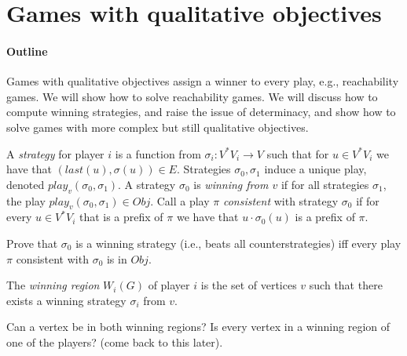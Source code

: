 \documentclass[a4paper,10pt]{article}
\newcommand{\obj}{Obj}
\begin{document}


\section{Games with qualitative objectives} 
\paragraph{Outline} Games with qualitative objectives assign a winner to every play, e.g., reachability games. We will show how to solve reachability games. We will discuss how to compute winning strategies, and raise the issue of determinacy, and show how to solve games with more complex but still qualitative objectives.

\begin{definition}
A \emph{strategy} for player $i$ is a function from $\sigma_i:V^*V_i \to V$ such 
that for $u \in V^*V_i$ we have that $(last(u),\sigma(u)) \in E$. 
Strategies $\sigma_0, \sigma_1$ induce a unique play, denoted $play_v(\sigma_0,\sigma_1)$.
A strategy $\sigma_0$ is \emph{winning from $v$} if for all strategies $\sigma_1$, the play $play_v(\sigma_0,\sigma_1) \in \obj$.
Call a play $\pi$ \emph{consistent} with strategy $\sigma_0$ if for every $u \in V^*V_i$ that is a prefix of $\pi$ we have that 
 $u \cdot \sigma_0(u)$ is a prefix of $\pi$. 
\end{definition}


\begin{question} 
 Prove that $\sigma_0$ is a winning strategy (i.e., beats all counterstrategies) iff every play $\pi$ consistent with $\sigma_0$ is in $\obj$.
\end{question}

\begin{definition}
The \emph{winning region} $W_i(G)$ of player $i$ is the set of vertices $v$ such that there exists a winning strategy $\sigma_i$ from $v$. 
\end{definition}

\begin{question}
Can a vertex be in both winning regions? Is every vertex in a winning region of one of the players? (come back to this later).
\end{question}
\end{document}
